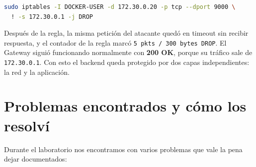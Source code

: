 \documentclass[11pt,a4paper]{article}
\begin{document}
\begin{lstlisting}[language=bash]
sudo iptables -I DOCKER-USER -d 172.30.0.20 -p tcp --dport 9000 \
  ! -s 172.30.0.1 -j DROP
\end{lstlisting}

Después de la regla, la misma petición del atacante quedó en timeout sin recibir respuesta, y el contador de la regla marcó \texttt{5 pkts / 300 bytes DROP}. El Gateway siguió funcionando normalmente con \textbf{200 OK}, porque su tráfico sale de \texttt{172.30.0.1}. Con esto el backend queda protegido por dos capas independientes: la red y la aplicación.

\section{Problemas encontrados y cómo los resolví}

Durante el laboratorio nos encontramos con varios problemas que vale la pena dejar documentados:
\end{document}
